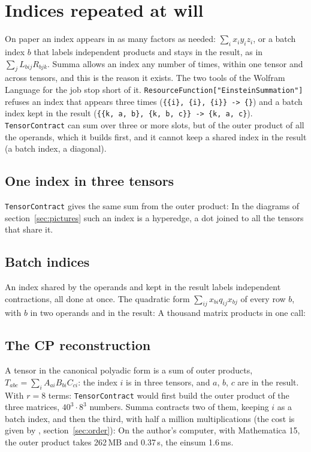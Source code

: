 \documentclass[11pt,a4paper]{article}
\begin{document}
\section{Indices repeated at will}\label{sec:repeated}
On paper an index appears in as many factors as needed: $\sum_ix_iy_iz_i$, or a batch index $b$ that labels independent
products and stays in the result, as in $\sum_jL_{bij}R_{bjk}$. Summa allows an index any number of times, within one tensor
and across tensors, and this is the reason it exists. The two tools of the Wolfram Language for the job stop short of
it. \texttt{ResourceFunction["EinsteinSummation"]} refuses an index that appears three times
(\texttt{\{\{i\}, \{i\}, \{i\}\} -> \{\}}) and a batch index kept in the result
(\texttt{\{\{k, a, b\}, \{k, b, c\}\} -> \{k, a, c\}}). \texttt{TensorContract} can sum over three or more slots, but of the
outer product of all the operands, which it builds first, and it cannot keep a shared index in the result (a batch index,
a diagonal).

\subsection{One index in three tensors}
\texttt{TensorContract} gives the same sum from the outer product:
In the diagrams of section~\ref{sec:pictures} such an index is a hyperedge, a dot joined to all the tensors that share it.

\subsection{Batch indices}
An index shared by the operands and kept in the result labels independent contractions, all done at once. The quadratic
form $\sum_{ij}x_{bi}q_{ij}x_{bj}$ of every row $b$, with $b$ in two operands and in the result:
A thousand matrix products in one call:

\subsection{The CP reconstruction}
A tensor in the canonical polyadic form is a sum of outer products, $T_{abc}=\sum_iA_{ai}B_{bi}C_{ci}$: the index $i$ is in
three tensors, and $a$, $b$, $c$ are in the result. With $r=8$ terms:
\texttt{TensorContract} would first build the outer product of the three matrices, $40^3\cdot8^3$ numbers. Summa contracts
two of them, keeping $i$ as a batch index, and then the third, with half a million multiplications (the cost is given by
, section~\ref{sec:order}):
On the author's computer, with Mathematica 15, the outer product takes 262\,MB and 0.37\,s, the einsum 1.6\,ms.
\end{document}
